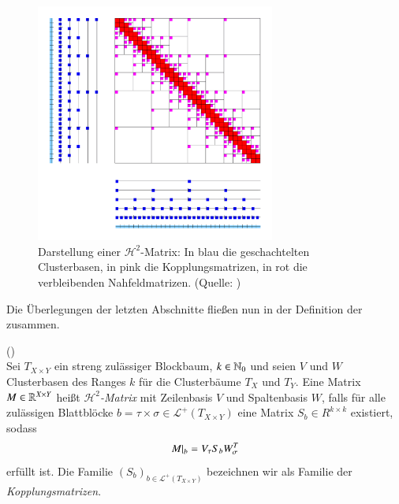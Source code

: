     \subsection{\hquad}
    \label{sec:hquad}
    
    \begin{figure}[b]
      \includegraphics[width=0.7\textwidth]{img/h2-matrix.png}
      \caption{Darstellung einer $\mathcal{H}^2$-Matrix: In blau die geschachtelten Clusterbasen, in pink die Kopplungsmatrizen, in rot die verbleibenden Nahfeldmatrizen. (Quelle: \citet{h2slides})}
      \label{fig:h2}
    \end{figure}

    
      Die Überlegungen der letzten Abschnitte fließen nun in der Definition der \hquad zusammen.
      
      \begin{defn}
	(\hquad)\\
	Sei $T_{X \times Y}$ ein streng zulässiger Blockbaum, $k \in \mathbb{N}_0$ und seien $V$ und $W$ Clusterbasen des Ranges $k$ für die Clusterbäume $T_X$ und $T_Y$. Eine Matrix 
	$M \in \mathbb{R}^{X \times Y}$ heißt \textit{$\mathcal{H}^2$-Matrix} mit Zeilenbasis $V$ und Spaltenbasis $W$, falls für alle zulässigen Blattblöcke 
	$b = \tau \times \sigma \in \mathcal{L}^+\left(T_{X \times Y}\right)$ eine Matrix $S_b \in R^{k \times k}$ existiert, sodass
	\begin{equation*}
	  \left. M \right|_b = V_\tau S_b W_\sigma^T
	\end{equation*}
	erfüllt ist. Die Familie $\left(S_b\right)_{b \in \mathcal{L}^+\left(T_{X \times Y}\right)}$ bezeichnen wir als Familie der \textit{Kopplungsmatrizen}.
      \end{defn}
      
